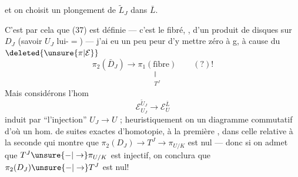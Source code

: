 
et on choisit un plongement de $\tilde L_J$ dans $\bar L$.

C'est par cela que (37) est définie --- c'est le  fibré, , d'un produit de disques sur $D_J$ (savoir $U_J$ lui-$=$) --- j'ai eu un peu peur d'y mettre  zéro à g, à cause du $\deleted{\unsure{\pi|\mathcal E}}$
\[
\pi_2(\bar D_J)\longrightarrow
\underset{\substack{\Vert\\ T^J}}{\pi_1(\text{fibre})}
\qquad (?)!
\]
Mais considérons l'hom
\[
\mathcal E_{U_J}^{\tilde U_J}\longrightarrow\mathcal E_U^{\bar L}
\]
induit par ``l'injection'' $U_J\longrightarrow U$ ;  heuristiquement on  un diagramme  commutatif
d'où un hom. de suites exactes d'homotopie,  à la première , dans celle relative à la seconde
qui montre que  $\pi_2(D_J)\longrightarrow T^J\longrightarrow\pi_{U/K}$ est nul --- donc si on admet que $T^J\unsure{-|\to}\pi_{U/K}$ est injectif, on conclura que $\pi_2(D_J)\unsure{-|\to}T^J$ est nul!

